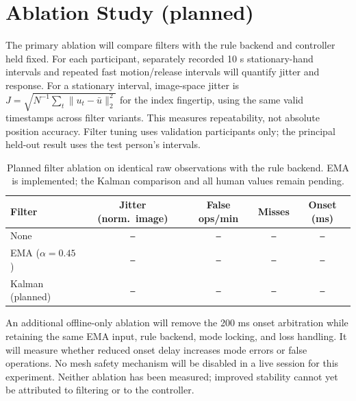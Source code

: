 \documentclass{article}
\newcommand{\missing}{\texttt{---}}
\begin{document}
\section{Ablation Study (planned)}\label{sec:ablation}
The primary ablation will compare filters with the rule backend and controller held
fixed. For each participant, separately recorded 10 s stationary-hand intervals
and repeated fast motion/release intervals will quantify jitter and response.
For a stationary interval, image-space jitter is
$J=\sqrt{N^{-1}\sum_t\|u_t-\bar u\|_2^2}$ for the index fingertip, using the same
valid timestamps across filter variants. This measures repeatability, not absolute
position accuracy. Filter tuning uses validation participants only; the principal
held-out result uses the test person's intervals.

\begin{table}[htbp]
\caption{Planned filter ablation on identical raw observations with the rule backend.
EMA is implemented; the Kalman comparison and all human values remain pending.}
\label{tab:ablation}
\centering
\begin{tabular}{@{}lcccc@{}}
\toprule
Filter & Jitter (norm.\ image) & False ops/min & Misses & Onset (ms) \\
\midrule
None & \missing & \missing & \missing & \missing \\
EMA ($\alpha=0.45$) & \missing & \missing & \missing & \missing \\
Kalman (planned) & \missing & \missing & \missing & \missing \\
\bottomrule
\end{tabular}
\end{table}

An additional offline-only ablation will remove the 200 ms onset arbitration while
retaining the same EMA input, rule backend, mode locking, and loss handling. It will
measure whether reduced onset delay increases mode errors or false operations.
No mesh safety mechanism will be disabled in a live session for this experiment.
Neither ablation has been measured; improved stability cannot yet be attributed
to filtering or to the controller.
\end{document}
